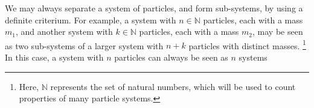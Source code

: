 We may always separate a system of particles, and form sub-systems, by using a definite criterium. For example, a system with $n\in\mathbb{N}$ particles, each with a mass $m_1$, and another system with $k\in\mathbb{N}$ particles, each with a mass $m_2$, may be seen as two sub-systems of a larger system with $n+k$ particles with distinct masses. \footnote{Here, $\mathbb{N}$ represents the set of natural numbers, which will be used to count properties of many particle systems.} In this case, a system with $n$ particles can always be seen as $n$ systems 
